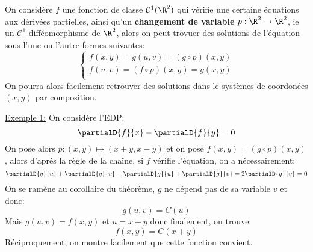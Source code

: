 \subsection*{}
On considère \(f\) une fonction de classe \(\mathcal{C}^1(\R^2)\) qui vérifie une certaine équations aux dérivées partielles, ainsi qu'un \textbf{changement de variable} \(p : \R^2 \rightarrow \R^2\), ie un \(\mathcal{C}^1\)-difféomorphisme de \(\R^2\), alors on peut trovuer des solutions de l'équation sous l'une ou l'autre formes suivantes:
\[
   \begin{cases}
      f(x, y) = g(u, v) = (g \circ p)(x, y) \\
      f(u, v) = (f \circ p)(x, y) = g(x, y)\\
   \end{cases}
\]
On pourra alors facilement retrouver des solutions dans le systèmes de coordonées \((x, y)\) par composition.\<

\uline{Exemple 1:} On considère l'EDP:
\[
   \partialD{f}{x} - \partialD{f}{y} = 0   
\]
On pose alors \(p: (x, y) \mapsto (x + y, x - y)\) et on pose \(f(x, y) = (g \circ p)(x, y)\), alors d'aprés la règle de la chaîne, si \(f\) vérifie l'équation, on a nécessairement:
\[
   \partialD{g}{u} + \partialD{g}{v} - \partialD{g}{u} + \partialD{g}{v} = 2\partialD{g}{v} = 0
\]
On se ramène au corollaire du théorème, \(g\) ne dépend pas de sa variable \(v\) et donc:
\[
   g(u, v) = C(u)   
\]
Mais \(g(u, v) = f(x, y)\) et \(u = x + y\) donc finalement, on trouve:
\[
   f(x, y) = C(x + y)    
\]
Réciproquement, on montre facilement que cette fonction convient.

\chapter*{} %
